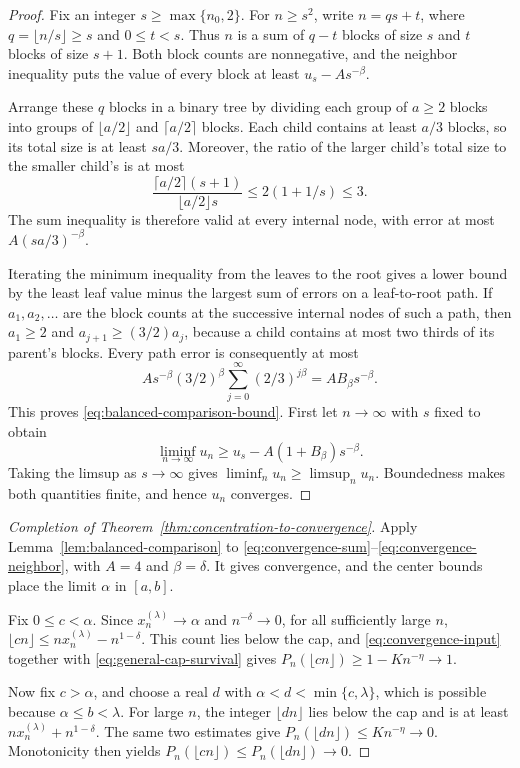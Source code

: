 \begin{proof}
Fix an integer \(s\ge\max\{n_0,2\}\).  For \(n\ge s^2\),
write \(n=qs+t\), where \(q=\lfloor n/s\rfloor\ge s\) and \(0\le t<s\).
Thus \(n\) is a sum of \(q-t\) blocks of size \(s\) and \(t\) blocks
of size \(s+1\).  Both block counts are nonnegative, and the neighbor
inequality puts the value of every block at least
\(u_s-As^{-\beta}\).

Arrange these \(q\) blocks in a binary tree by dividing each group of
\(a\ge2\) blocks into groups of \(\lfloor a/2\rfloor\) and
\(\lceil a/2\rceil\) blocks.  Each child contains at least \(a/3\)
blocks, so its total size is at least \(sa/3\).  Moreover, the ratio of
the larger child's total size to the smaller child's is at most
\[
 \frac{\lceil a/2\rceil(s+1)}{\lfloor a/2\rfloor s}
 \le2(1+1/s)\le3.
\]
The sum inequality is therefore valid at every internal node, with
error at most \(A(sa/3)^{-\beta}\).

Iterating the minimum inequality from the leaves to the root gives a
lower bound by the least leaf value minus the largest sum of errors on
a leaf-to-root path.  If \(a_1,a_2,\ldots\) are the block counts at the
successive internal nodes of such a path, then \(a_1\ge2\) and
\(a_{j+1}\ge(3/2)a_j\), because a child contains at most two thirds of
its parent's blocks.  Every path error is consequently at most
\[
 As^{-\beta}(3/2)^\beta
   \sum_{j=0}^{\infty}(2/3)^{j\beta}
 =AB_\beta s^{-\beta}.
\]
This proves \eqref{eq:balanced-comparison-bound}.  First let
\(n\to\infty\) with \(s\) fixed to obtain
\[
 \liminf_{n\to\infty}u_n
 \ge u_s-A(1+B_\beta)s^{-\beta}.
\]
Taking the limsup as \(s\to\infty\) gives
\(\liminf_n u_n\ge\limsup_n u_n\).  Boundedness makes both quantities
finite, and hence \(u_n\) converges.
\end{proof}

\begin{proof}[Completion of Theorem~\ref{thm:concentration-to-convergence}]
Apply Lemma~\ref{lem:balanced-comparison} to
\eqref{eq:convergence-sum}--\eqref{eq:convergence-neighbor}, with
\(A=4\) and \(\beta=\delta\).  It gives convergence, and the center
bounds place the limit \(\alpha\) in \([a,b]\).

Fix \(0\le c<\alpha\).  Since \(x_n^{(\lambda)}\to\alpha\) and
\(n^{-\delta}\to0\), for all sufficiently large \(n\),
\(\lfloor cn\rfloor\le nx_n^{(\lambda)}-n^{1-\delta}\).  This count
lies below the cap, and \eqref{eq:convergence-input} together with
\eqref{eq:general-cap-survival} gives
\(P_n(\lfloor cn\rfloor)\ge1-Kn^{-\eta}\to1\).

Now fix \(c>\alpha\), and choose a real \(d\) with
\(\alpha<d<\min\{c,\lambda\}\), which is possible because
\(\alpha\le b<\lambda\).  For large \(n\), the integer
\(\lfloor dn\rfloor\) lies below the cap and is at least
\(nx_n^{(\lambda)}+n^{1-\delta}\).  The same two estimates give
\(P_n(\lfloor dn\rfloor)\le Kn^{-\eta}\to0\).
Monotonicity then yields
\(P_n(\lfloor cn\rfloor)\le P_n(\lfloor dn\rfloor)\to0\).
\end{proof}

